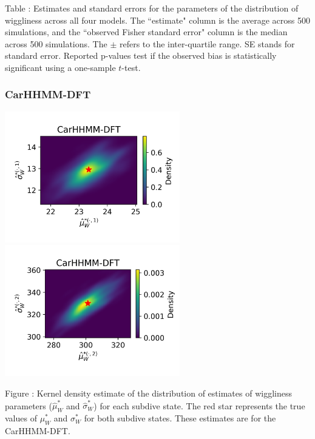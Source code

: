 \documentclass{article}
\begin{document}
        \noindent Table : Estimates and standard errors for the parameters of the distribution of wiggliness across all four models. The ``estimate" column is the average across 500 simulations, and the ``observed Fisher standard error" column is the median across 500 simulations. The $\pm$ refers to the inter-quartile range. SE stands for standard error. Reported p-values test if the observed bias is statistically significant using a one-sample $t$-test.
        \addtocounter{tablenum}{1}
    
        \subsubsection{CarHHMM-DFT}
        \begin{center}
        \includegraphics[width=3in]{../Plots/hhmm_FV_MLE_density_FoVeDBA_0_0.png}
        \includegraphics[width=3in]{../Plots/hhmm_FV_MLE_density_FoVeDBA_0_1.png}
        \end{center}
        
        \noindent Figure : Kernel density estimate of the distribution of estimates of wiggliness parameters ($\hat \mu^*_W$ and $\hat \sigma^*_W$) for each subdive state. The red star represents the true values of $\mu^*_W$ and $\sigma^*_W$ for both subdive states. These estimates are for the CarHHMM-DFT.
        \addtocounter{fignum}{1}
        
\end{document}
